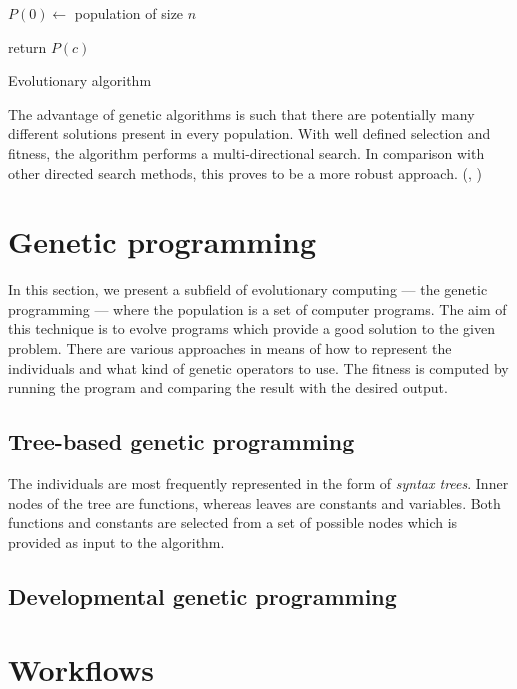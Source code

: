 \begin{algorithm}
\DontPrintSemicolon
  \;
  $P(0) \longleftarrow$ population of size $n$

  \;
  return $P(c)$  
\caption{Evolutionary algorithm\label{alg:EA}}
\end{algorithm}

The advantage of genetic algorithms is such that there are potentially many different solutions present in every population. With well defined selection and fitness, the algorithm performs a multi-directional search. In comparison with other directed search methods, this proves to be a more robust approach. (\cite{Michalewicz:1996:GAD:229930}, \cite{Mitchell:1997:ML:541177}) %

\section{Genetic programming}
In this section, we present a subfield of evolutionary computing --- the genetic programming --- where the population is a set of computer programs. The aim of this technique is to evolve programs which provide a good solution to the given problem. There are various approaches in means of how to represent the individuals and what kind of genetic operators to use. The fitness is computed by running the program and comparing the result with the desired output. \cite{Poli:2008:FGG:1796422}
\subsection{Tree-based genetic programming}
The individuals are most frequently represented in the form of \textit{syntax trees}. Inner nodes of the tree are functions, whereas leaves are constants and variables. Both functions and constants are selected from a set of possible nodes which is provided as input to the algorithm.


\subsection{Developmental genetic programming}

\section{Workflows}
